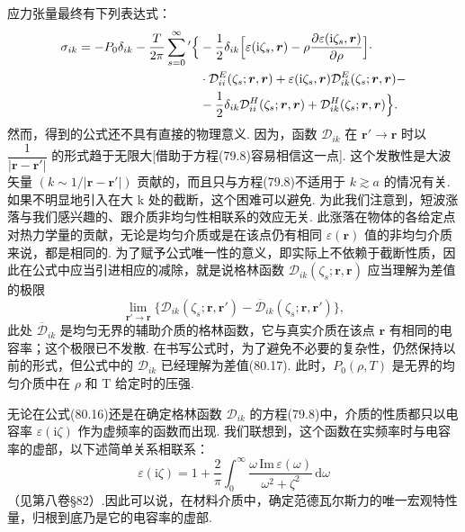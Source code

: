 应力张量最终有下列表达式：
\begin{equation}
  \begin{aligned}
    \sigma_{ik}=-P_0\delta_{ik}-\frac{T}{2\pi}\sum_{s=0}^{\infty}{}'\Bigl\{&-\frac{1}{2}\delta_{ik}\Bigl[\varepsilon(\mathrm{i}\zeta_s,\bm{r})-\rho\frac{\partial\varepsilon(\mathrm{i}\zeta_s,\bm{r})}{\partial\rho}\Bigr]\cdot\\
    &\cdot\mathcal{D}^{E}_{ii}(\zeta_s;\bm{r},\bm{r})+\varepsilon(\mathrm{i}\zeta_s,\bm{r})\mathcal{D}^{E}_{ik}(\zeta_s;\bm{r},\bm{r})-\\
    &-\frac{1}{2}\delta_{ik}\mathcal{D}^{H}_{ii}(\zeta_s;\bm{r},\bm{r})+\mathcal{D}^{H}_{ik}(\zeta_s;\bm{r},\bm{r})\Bigr\}.
  \end{aligned}
\end{equation}
然而，得到的公式还不具有直接的物理意义. 因为，函数 $\mathcal{D}_{ik}$ 在 $\bm{r}'\to\bm{r}$ 时以 $\dfrac{1}{|\bm{r}-\bm{r}'|}$ 的形式趋于无限大[借助于方程(79.8)容易相信这一点]. 这个发散性是大波矢量 $(k\sim 1/|\bm{r}-\bm{r}'|)$ 贡献的，而且只与方程(79.8)不适用于 $k\gtrsim a$ 的情况有关. 如果不明显地引入在大 k 处的截断，这个困难可以避免. 为此我们注意到，短波涨落与我们感兴趣的、跟介质非均匀性相联系的效应无关. 此涨落在物体的各给定点对热力学量的贡献，无论是均匀介质或是在该点仍有相同 $\varepsilon(\bm{r})$ 值的非均匀介质来说，都是相同的. 为了赋予公式唯一性的意义，即实际上不依赖于截断性质，因此在公式中应当引进相应的减除，就是说格林函数 $\mathcal{D}_{ik}(\zeta_s;\bm{r},\bm{r})$ 应当理解为差值的极限
\begin{equation}
  \operatorname*{lim}_{\bm{r}'\to\bm{r}}\bigl\{\mathcal{D}_{ik}(\zeta_s;\bm{r},\bm{r}')-\overline{\mathcal{D}}_{ik}(\zeta_s;\bm{r},\bm{r}')\bigr\},
\end{equation}
此处 $\overline{\mathcal{D}}_{ik}$ 是均匀无界的辅助介质的格林函数，它与真实介质在该点 $\bm{r}$ 有相同的电容率；这个极限已不发散. 在书写公式时，为了避免不必要的复杂性，仍然保持以前的形式，但公式中的 $\mathcal{D}_{ik}$ 已经理解为差值(80.17). 此时，$P_0(\rho,T)$ 是无界的均匀介质中在 $\rho$ 和 T 给定时的压强.

无论在公式(80.16)还是在确定格林函数 $\mathcal{D}_{ik}$ 的方程(79.8)中，介质的性质都只以电容率 $\varepsilon(\mathrm{i}\zeta)$ 作为虚频率的函数而出现. 我们联想到，这个函数在实频率时与电容率的虚部，以下述简单关系相联系：
\begin{equation}
  \varepsilon(\mathrm{i}\zeta)=1+\frac{2}{\pi}\int_{0}^{\infty}\frac{\omega\,\mathrm{Im}\,\varepsilon(\omega)}{\omega^{2}+\zeta^{2}}\,\mathrm{d}\omega
\end{equation}
（见第八卷§82）.因此可以说，在材料介质中，确定范德瓦尔斯力的唯一宏观特性量，归根到底乃是它的电容率的虚部.

